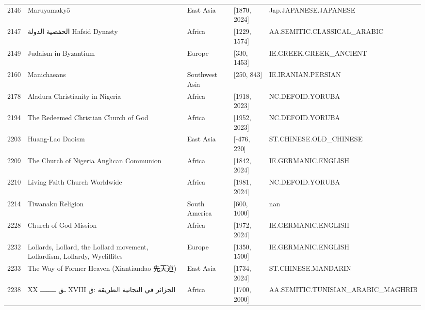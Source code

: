 {\begin{longtable}{rp{3.5cm}llp{3.5cm}}
2146 & {\raggedright Maruyamakyō} & East Asia & [1870, 2024] & {\raggedright Jap.\allowbreak{}JAPANESE.\allowbreak{}JAPANESE} \\
2147 & {\raggedright {\arabicfont الحفصية الدولة} Hafsid Dynasty} & Africa & [1229, 1574] & {\raggedright AA.\allowbreak{}SEMITIC.\allowbreak{}CLASSICAL\_\allowbreak{}ARABIC} \\
2149 & {\raggedright Judaism in Byzantium} & Europe & [330, 1453] & {\raggedright IE.\allowbreak{}GREEK.\allowbreak{}GREEK\_\allowbreak{}ANCIENT} \\
2160 & {\raggedright Manichaeans} & Southwest Asia & [250, 843] & {\raggedright IE.\allowbreak{}IRANIAN.\allowbreak{}PERSIAN} \\
2178 & {\raggedright Aladura Christianity in Nigeria} & Africa & [1918, 2023] & {\raggedright NC.\allowbreak{}DEFOID.\allowbreak{}YORUBA} \\
2194 & {\raggedright The Redeemed Christian Church of God} & Africa & [1952, 2023] & {\raggedright NC.\allowbreak{}DEFOID.\allowbreak{}YORUBA} \\
2203 & {\raggedright Huang-Lao Daoism} & East Asia & [-476, 220] & {\raggedright ST.\allowbreak{}CHINESE.\allowbreak{}OLD\_\allowbreak{}CHINESE} \\
2209 & {\raggedright The Church of Nigeria Anglican Communion} & Africa & [1842, 2024] & {\raggedright IE.\allowbreak{}GERMANIC.\allowbreak{}ENGLISH} \\
2210 & {\raggedright Living Faith Church Worldwide} & Africa & [1981, 2024] & {\raggedright NC.\allowbreak{}DEFOID.\allowbreak{}YORUBA} \\
2214 & {\raggedright Tiwanaku Religion} & South America & [600, 1000] & {\raggedright nan} \\
2228 & {\raggedright Church of God Mission} & Africa & [1972, 2024] & {\raggedright IE.\allowbreak{}GERMANIC.\allowbreak{}ENGLISH} \\
2232 & {\raggedright Lollards, Lollard, the Lollard movement, Lollardism,  Lollardy, Wycliffites} & Europe & [1350, 1500] & {\raggedright IE.\allowbreak{}GERMANIC.\allowbreak{}ENGLISH} \\
2233 & {\raggedright The Way of Former Heaven (Xiantiandao 先天道)} & East Asia & [1734, 2024] & {\raggedright ST.\allowbreak{}CHINESE.\allowbreak{}MANDARIN} \\
2238 & {\raggedright XX {\arabicfont ـق    ــــــــ}  XVIII   {\arabicfont الجزائر في التجانية الطريقة} :{\arabicfont ق}} & Africa & [1700, 2000] & {\raggedright AA.\allowbreak{}SEMITIC.\allowbreak{}TUNISIAN\_\allowbreak{}ARABIC\_\allowbreak{}MAGHRIB} \\

\end{longtable}}
